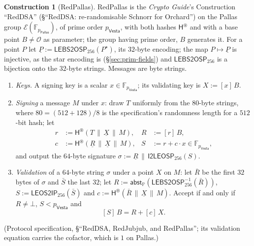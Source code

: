 \documentclass[11pt,a4paper]{article}
\theoremstyle{definition}
\newtheorem{construction}[theorem]{Construction}
\newcommand{\F}{\mathbb{F}}
\newcommand{\PP}{\mathbb{P}}
\newcommand{\Pallas}{\ensuremath{\mathsf{Pallas}}}
\newcommand{\Vesta}{\ensuremath{\mathsf{Vesta}}}
\newcommand{\Ep}{\ensuremath{\mathcal{E}}}
\begin{document}
\begin{construction}[RedPallas]
RedPallas is the \emph{Crypto Guide}'s Construction ``RedDSA''
(\S``RedDSA: re-randomisable Schnorr for Orchard'') on the Pallas group
$\Ep(\F_{p_{\Pallas}})$, of prime order $p_{\Vesta}$, with both hashes
$\mathsf{H}^{\circledast}$ and with a base point $B \neq \mathcal{O}$ as
parameter; the group having prime order, $B$ generates it. For a point $P$
let $\underline{P} := \mathsf{LEBS2OSP}_{256}(P^{\star})$, its $32$-byte
encoding; the map $P \mapsto \underline{P}$ is injective, as the star
encoding is (\S\ref{sec:prim-fields}) and $\mathsf{LEBS2OSP}_{256}$ is a
bijection onto the $32$-byte strings. Messages are byte strings.
\begin{enumerate}
\item \emph{Keys.} A signing key is a scalar $x \in \F_{p_{\Vesta}}$; its
  validating key is $X := [x]\,B$.
\item \emph{Signing} a message $M$ under $x$: draw $T$ uniformly from the
  $80$-byte strings, where $80 = (512 + 128)/8$ is the specification's
  randomness length for a $512$-bit hash; let
  \begin{align*}
    r &:= \mathsf{H}^{\circledast}(T \,\|\, \underline{X} \,\|\, M), &
    R &:= [r]\,B, \\
    c &:= \mathsf{H}^{\circledast}(\underline{R} \,\|\, \underline{X}
      \,\|\, M), &
    S &:= r + c \cdot x \in \F_{p_{\Vesta}},
  \end{align*}
  and output the $64$-byte signature
  $\sigma := \underline{R} \,\|\, \mathsf{I2LEOSP}_{256}(S)$.
\item \emph{Validation} of a $64$-byte string $\sigma$ under a point $X$ on
  $M$: let $\bar{R}$ be the first $32$ bytes of $\sigma$ and $\bar{S}$ the
  last $32$; let
  $R := \mathsf{abst}_{\PP}(\mathsf{LEBS2OSP}_{256}^{-1}(\bar{R}))$,
  $S := \mathsf{LEOS2IP}_{256}(\bar{S})$ and
  $c := \mathsf{H}^{\circledast}(\bar{R} \,\|\, \underline{X} \,\|\, M)$.
  Accept if and only if $R \neq \bot$, $S < p_{\Vesta}$ and
  \begin{equation}\label{eq:spendauth-verify}
    [S]\,B = R + [c]\,X .
  \end{equation}
\end{enumerate}
(Protocol specification, \S``RedDSA, RedJubjub, and RedPallas''; its
validation equation carries the cofactor, which is $1$ on Pallas.)
\end{construction}
\end{document}
